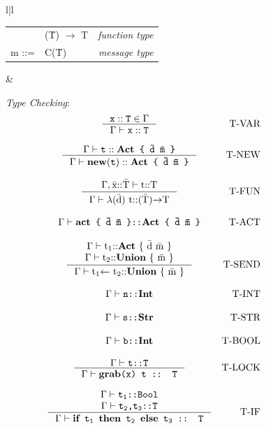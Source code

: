 \documentclass[5p,times]{elsarticle}
\begin{document}
\begin{figure}
\begin{tabular}{l|l}
\begin{minipage}{.275\textwidth}
\begin{tabular}{llr}
& (\={T}) $\rightarrow$ T & {\it function type}\\
m ::= & C(\={T}) & {\it message type}\\
\end{tabular}
\end{minipage}
&
\begin{minipage}{0.7\textwidth}
\footnotesize
{\it Type Checking}:\\
\[\begin{array}{cc}
\begin{array}{cr}
\inference{{\tt x::T}\in\Gamma}{\Gamma\vdash{\tt x::T}}&\text{T-VAR}\\\\
\inference{\Gamma\vdash{\tt t}::\text{\tt {\bf Act} \{ \={d} \={m} \}}}{\Gamma\vdash{\tt {\bf new}(t)} :: \text{\tt {\bf Act} \{ \={d} \={m} \}}}&\text{T-NEW}\\\\
\inference{\Gamma,\text{\={x}::\={T}}\vdash\text{t::T}}{\Gamma\vdash\text{$\lambda$(\={d}) t::(\={T})$\rightarrow$T}}&\text{T-FUN}\\\\
%
\Gamma\vdash\text{\tt {\bf act} \{ \={d} \={m} \}::{\bf Act} \{ \={d} \={m} \}}&\text{T-ACT}\\\\
\inference{\Gamma\vdash\text{t\textsubscript{1}::{\bf Act} \{ \={d} \={m} \}}\\\Gamma\vdash\text{t\textsubscript{2}::{\bf Union} \{ \={m} \}}}{\Gamma\vdash\text{t\textsubscript{1}$\leftarrow$ t\textsubscript{2}::{\bf Union} \{ \={m} \}}}&\text{T-SEND}\\\\
%
\Gamma\vdash\text{\tt n::{\bf Int}}&\text{T-INT}\\\\
\Gamma\vdash\text{\tt s::{\bf Str}}&\text{T-STR}\\\\
\Gamma\vdash\text{\tt b::{\bf Int}}&\text{T-BOOL}\\\\
\inference{\Gamma\vdash\text{\tt t::T}}{\Gamma\vdash\text{\tt{\bf grab}(x) t :: T}}&\text{T-LOCK}\\\\
\inference{\Gamma\vdash\text{\tt t\textsubscript{1}::Bool}\\\Gamma\vdash\text{\tt t\textsubscript{2},t\textsubscript{3}::T}}{\Gamma\vdash\text{\tt{\bf if} t\textsubscript{1} {\bf then} t\textsubscript{2} {\bf else} t\textsubscript{3} :: T}}&\text{T-IF}
\end{array}

\end{array}\]
\end{minipage}
\end{tabular}
\end{figure}
\end{document}
